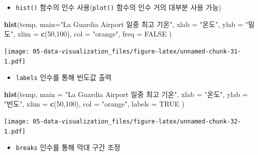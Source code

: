 \documentclass[
  11pt,
]{krantz}
\newenvironment{Shaded}{\begin{snugshade}}{\end{snugshade}}
\newcommand{\DataTypeTok}[1]{\textcolor[rgb]{0.27,0.27,0.27}{#1}}
\newcommand{\DecValTok}[1]{\textcolor[rgb]{0.06,0.06,0.06}{#1}}
\newcommand{\KeywordTok}[1]{\textcolor[rgb]{0.27,0.27,0.27}{\textbf{#1}}}
\newcommand{\NormalTok}[1]{#1}
\newcommand{\OtherTok}[1]{\textcolor[rgb]{0.37,0.37,0.37}{#1}}
\newcommand{\StringTok}[1]{\textcolor[rgb]{0.5,0.5,0.5}{#1}}
\providecommand{\tightlist}{%
  \setlength{\itemsep}{0pt}\setlength{\parskip}{0pt}}
\begin{document}
\normalsize

\begin{itemize}
\tightlist
\item
  \texttt{hist()} 함수의 인수 사용(\texttt{plot()} 함수의 인수 거의 대부분 사용 가능)
\end{itemize}

\footnotesize

\begin{Shaded}
\begin{Highlighting}[]
\KeywordTok{hist}\NormalTok{(temp,}
\DataTypeTok{main=}\StringTok{"La Guardia Airport 일중 최고 기온"}\NormalTok{,}
\DataTypeTok{xlab =} \StringTok{"온도"}\NormalTok{,}
\DataTypeTok{ylab =} \StringTok{"밀도"}\NormalTok{,}
\DataTypeTok{xlim =} \KeywordTok{c}\NormalTok{(}\DecValTok{50}\NormalTok{,}\DecValTok{100}\NormalTok{),}
\DataTypeTok{col =} \StringTok{"orange"}\NormalTok{,}
\DataTypeTok{freq =} \OtherTok{FALSE}
\NormalTok{)}
\end{Highlighting}
\end{Shaded}

\texttt{[image: 05-data-visualization\_files/figure-latex/unnamed-chunk-31-1.pdf]}

\normalsize

\begin{itemize}
\tightlist
\item
  \texttt{labels} 인수를 통해 빈도값 출력
\end{itemize}

\footnotesize

\begin{Shaded}
\begin{Highlighting}[]
\KeywordTok{hist}\NormalTok{(temp,}
\DataTypeTok{main =} \StringTok{"La Guardia Airport 일중 최고 기온"}\NormalTok{,}
\DataTypeTok{xlab =} \StringTok{"온도"}\NormalTok{,}
\DataTypeTok{ylab =} \StringTok{"빈도"}\NormalTok{,}
\DataTypeTok{xlim =} \KeywordTok{c}\NormalTok{(}\DecValTok{50}\NormalTok{,}\DecValTok{100}\NormalTok{),}
\DataTypeTok{col =} \StringTok{"orange"}\NormalTok{,}
\DataTypeTok{labels =} \OtherTok{TRUE}
\NormalTok{)}
\end{Highlighting}
\end{Shaded}

\texttt{[image: 05-data-visualization\_files/figure-latex/unnamed-chunk-32-1.pdf]}

\normalsize

\begin{itemize}
\tightlist
\item
  \texttt{breaks} 인수를 통해 막대 구간 조정
\end{itemize}
\end{document}
